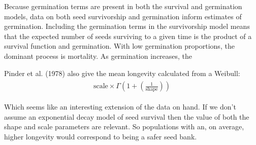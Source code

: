 \documentclass[12pt, oneside, titlepage]{article}   	%
\begin{document}
Because germination terms are present in both the survival and germination models, data on both seed survivorship and germination inform estimates of germination. Including the germination terms in the survivorship model means that the expected number of seeds surviving to a given time is the product of a survival function and germination. With low germination proportions, the dominant process is mortality. As germination increases, the 

Pinder et al. (1978) also give the mean longevity calculated from a Weibull:
%
\begin{align}
  \begin{split}
\mathrm{scale} \times \Gamma(1+(\frac{1}{\mathrm{shape}}))
  \end{split}
\end{align}

Which seems like an interesting extension of the data on hand. If we don't assume an exponential decay model of seed survival then the value of both the shape and scale parameters are relevant. So populations with an, on average, higher longevity would correspond to being a safer seed bank.


\clearpage
\newpage


 

\end{document}

